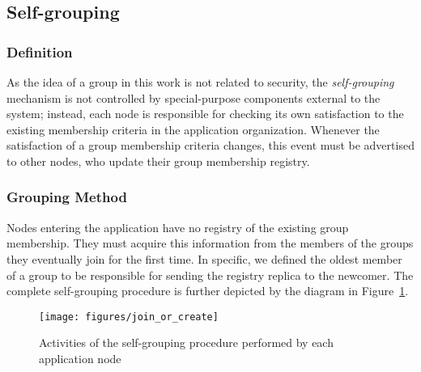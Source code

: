 \subsection{Self-grouping} 




\subsubsection{\textbf{Definition}} As the idea of a group in this work is not related to security, the \textit{self-grouping} mechanism is not controlled by special-purpose components external to the system; instead, each node is responsible for checking its own satisfaction to the existing membership criteria in the application organization. Whenever the satisfaction of a group membership criteria changes, this event must be  advertised to other nodes, who update their group membership registry. 

\subsubsection{\textbf{Grouping Method}} Nodes entering the application have no registry of the existing group membership. They must acquire this information from the members of the groups they eventually join for the first time. In specific, we defined the oldest member of a group to be responsible for sending the registry replica to the newcomer. The complete self-grouping procedure is further depicted by the diagram in Figure~\ref{fig:self_grouping}.
 
\begin{figure}[t!]
	\centering
	\texttt{[image: figures/join\_or\_create]}
	\caption{Activities of the self-grouping procedure performed by each application node}
	\label{fig:self_grouping}
\end{figure}

